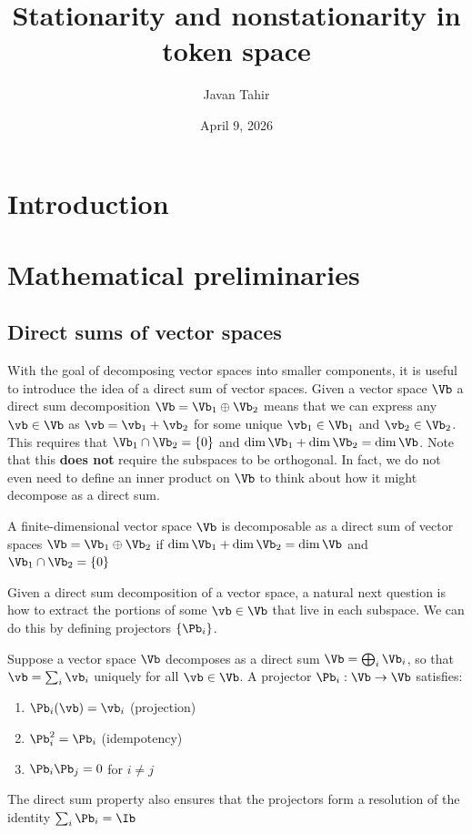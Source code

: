 \documentclass{article}
\title{Stationarity and nonstationarity in token space}
\author{Javan Tahir}
\date{April 9, 2026}
\begin{document}
\maketitle

\section{Introduction}

\section{Mathematical preliminaries}
\subsection{Direct sums of vector spaces}
With the goal of decomposing vector spaces into smaller components, it is useful to introduce the idea of a direct sum of vector spaces. Given a vector space $\Vb$ a direct sum decomposition $\Vb = \Vb_1 \oplus \Vb_2$ means that we can express any $\vb \in \Vb$ as $\vb = \vb_1 + \vb_2$ for some unique $\vb_1 \in \Vb_1$ and $\vb_2 \in \Vb_2$. This requires that $\Vb_1 \cap \Vb_2 = \{0\}$ and $\dim\Vb_1 + \dim\Vb_2 = \dim\Vb$. Note that this \textbf{does not} require the subspaces to be orthogonal. In fact, we do not even need to define an inner product on $\Vb$ to think about how it might decompose as a direct sum. 

\begin{definition}
    A finite-dimensional vector space $\Vb$ is decomposable as a direct sum of vector spaces $\Vb = \Vb_1 \oplus \Vb_2$ if $\dim\Vb_1 + \dim\Vb_2 = \dim\Vb$ and $\Vb_1 \cap \Vb_2 = \{0\}$
\end{definition}

Given a direct sum decomposition of a vector space, a natural next question is how to extract the portions of some $\vb \in \Vb$ that live in each subspace. We can do this by defining projectors $\{\Pb_i\}$. 

\begin{definition}[Projector]
    Suppose a vector space $\Vb$ decomposes as a direct sum $\Vb =\bigoplus_{i} \Vb_i$, so that $\vb = \sum_{i} \vb_i$ uniquely for all $\vb \in \Vb$. A projector $\Pb_i: \Vb \to \Vb$ satisfies:
    \begin{enumerate}
        \item $\Pb_i(\vb) = \vb_i$ (projection)
        \item $\Pb_i^2 = \Pb_i$ (idempotency)
        \item $\Pb_i \Pb_j = 0$ for $i \neq j$ 
    \end{enumerate}
    The direct sum property also ensures that the projectors form a resolution of the identity $\sum_i \Pb_i = \Ib$
\end{definition}
\end{document}
